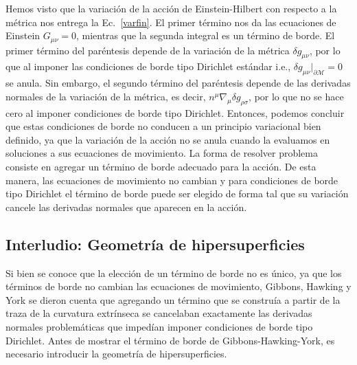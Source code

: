 \documentclass[../Main.tex]{subfiles}
\begin{document}
Hemos visto que la variación de la acción de Einstein-Hilbert con respecto a la métrica nos entrega la Ec.~\eqref{varfin}. El primer término nos da las ecuaciones de Einstein $G_{\mu\nu}=0$, mientras que la segunda integral es un término de borde. El primer término del paréntesis depende de la variación de la métrica $\delta g_{\mu\nu}$, por lo que al  imponer las condiciones de borde tipo Dirichlet estándar i.e., $\delta g_{\mu\nu}\big|_{\partial\mathcal{M}}=0$ se anula. Sin embargo, el segundo término del paréntesis depende de las derivadas normales de la variación de la métrica, es decir, $n^{\mu}\nabla_{\mu}\delta g_{\rho\sigma}$, por lo que no se hace cero al imponer condiciones de borde tipo Dirichlet. Entonces, podemos concluir que estas condiciones de borde no conducen a un principio variacional bien definido, ya que la variación de la acción no se anula cuando la evaluamos en soluciones a sus ecuaciones de movimiento.
La forma de resolver problema consiste en agregar un término de borde adecuado para la acción. De esta manera, las ecuaciones de movimiento no cambian y para condiciones de borde tipo Dirichlet el término de borde puede ser elegido de forma tal que su variación cancele las derivadas normales que aparecen en la acción. 







\subsection{Interludio: Geometría de hipersuperficies}
Si bien se conoce que la elección de un  término de borde no es único, ya que los términos de borde no cambian las ecuaciones de movimiento, Gibbons, Hawking y York \cite{Gibbons:1976ue,York:1972sj} se dieron cuenta que agregando un término que se construía a partir de la traza de la curvatura extrínseca se cancelaban exactamente las derivadas normales problemáticas que impedían imponer condiciones de borde tipo Dirichlet.
Antes de mostrar el término de borde de Gibbons-Hawking-York, es necesario introducir la geometría de hipersuperficies.
\end{document}
